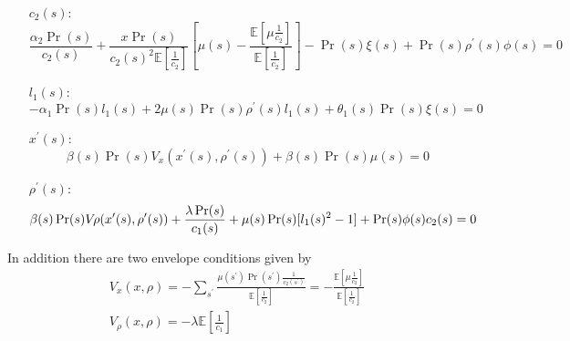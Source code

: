 \documentclass[thmsb,11pt]{article}
\begin{document}
{\begin{enumerate}
\item[$c_2(s):$]
\begin{equation}
\frac{\alpha_2 \Pr(s)}{c_2(s)} + \frac{x\Pr(s)}{c_2(s)^2\mathbb{E}[\frac1{c_2}]}%
\left[\mu(s)-\frac{\mathbb{E}[\mu\frac1{c_2}]}{\mathbb{E}[\frac1{c_2}]}%
\right]-\Pr(s)\xi(s)+\Pr(s)\rho^{\prime }(s)\phi(s)=0  \label{eq.c2FOC}
\end{equation}

\item[$l_1(s):$]
\begin{equation}
-\alpha_1\Pr(s)l_1(s)+2\mu(s)\Pr(s)\rho^{\prime
}(s)l_1(s)+\theta_1(s)\Pr(s)\xi(s)=0
\end{equation}

\item[$x^{\prime }(s):$]
\begin{equation}
\beta(s) \Pr(s)V_x(x^{\prime }(s),\rho^{\prime }(s)) + \beta(s)\Pr(s)\mu(s) = 0
\label{eq.x'FOC}
\end{equation}

\item[$\rho^{\prime }(s):$]
\begin{equation}
\beta(s) \Pr(s) V_\rho(x^{\prime }(s),\rho^{\prime }(s))+\frac{\lambda \Pr(s)}{%
c_1(s)}+\mu(s)\Pr(s)[l_1(s)^2-1]+\Pr(s)\phi(s)c_2(s) = 0  \label{eq.FOCNend}
\end{equation}
\end{enumerate}

In addition there are two envelope conditions given by
\begin{align}
V_x(x,\rho) = -\sum_{s^{\prime }}\frac{\mu(s^{\prime })\Pr(s^{\prime
})\frac1{c_2(s^{\prime })}}{\mathbb{E}[\frac1{c_2}]} = -\frac{\mathbb{E}%
[\mu\frac1{c_2}]}{\mathbb{E}[\frac1{c_2}]} \\
V_\rho(x,\rho) = -\lambda\mathbb{E}[\frac1{c_1}]  \label{eq.rho_env}
\end{align}

}
\end{document}
